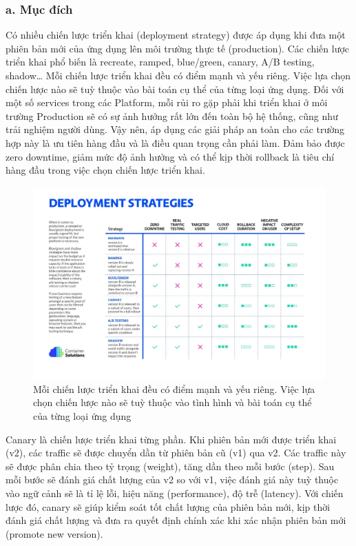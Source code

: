 \documentclass[12pt,a4paper]{report}
\begin{document}
{{		\subsubsection{a. Mục đích}
		Có nhiều chiến lược triển khai (deployment strategy) được áp dụng khi đưa một phiên bản mới của ứng dụng lên môi trường thực tế (production). Các chiến lược triển khai phổ biến là recreate, ramped, blue/green, canary, A/B testing, shadow… Mỗi chiến lược triển khai đều có điểm mạnh và yếu riêng. Việc lựa chọn chiến lược nào sẽ tuỳ thuộc vào bài toán cụ thể của từng loại ứng dụng. Đối với một số services trong các Platform, mỗi rủi ro gặp phải khi triển khai ở môi trường Production sẽ có sự ảnh hưởng rất lớn đến toàn bộ hệ thống, cũng như trải nghiệm người dùng. Vậy nên, áp dụng các giải pháp an toàn cho các trường hợp này là ưu tiên hàng đầu và là điều quan trọng cần phải làm. Đảm bảo được zero downtime, giảm mức độ ảnh hưởng và có thể kịp thời rollback là tiêu chí hàng đầu trong việc chọn chiến lược triển khai.
		\begin{figure}[h]
			\centering
			\includegraphics[width=0.7\linewidth]{Pics/3.3.1-1}
			\caption{Mỗi chiến lược triển khai đều có điểm mạnh và yếu riêng. Việc lựa chọn chiến lược nào sẽ tuỳ thuộc vào tình hình và bài toán cụ thể của từng loại ứng dụng}
			\label{fig:3.3-1}
		\end{figure}
		
		Canary là chiến lược triển khai từng phần. Khi phiên bản mới được triển khai (v2), các traffic sẽ được chuyển dần từ phiên bản cũ (v1) qua v2. Các traffic này sẽ được phân chia theo tỷ trọng (weight), tăng dần theo mỗi bước (step). Sau mỗi bước sẽ đánh giá chất lượng của v2 so với v1, việc đánh giá này tuỳ thuộc vào ngữ cảnh sẽ là tỉ lệ lỗi, hiệu năng (performance), độ trễ (latency). Với chiến lược đó, canary sẽ giúp kiểm soát tốt chất lượng của phiên bản mới, kịp thời đánh giá chất lượng và đưa ra quyết định chính xác khi xác nhận phiên bản mới (promote new version).
		
}}
\end{document}
